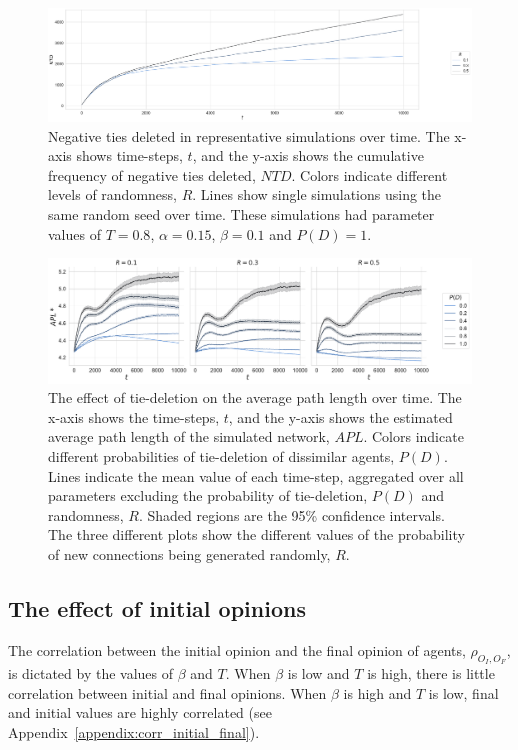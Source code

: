 \documentclass[11pt]{article}
\begin{document}
\begin{figure}[H]
    \centering
    \includegraphics[width=.7\linewidth]{../plots/example/Example_Negative_Ties_Deleted.pdf}
  \caption{Negative ties deleted in representative simulations over time. The x-axis shows time-steps, $t$, and the y-axis shows the cumulative frequency of negative ties deleted, $NTD$. Colors indicate different levels of randomness, $R$. Lines show single simulations using the same random seed over time. These simulations had parameter values of $T = 0.8$, $\alpha = 0.15$, $\beta = 0.1$ and $P(D)=1$.}
  \label{appendix:example_ntd}
\end{figure}

\begin{figure}[H]
    \centering
    \includegraphics[width=.98\linewidth]{../plots/overall/Average_Path_Length_Ties_Deleted.pdf}
  \caption{The effect of tie-deletion on the average path length over time. The x-axis shows the time-steps, $t$, and the y-axis shows the estimated average path length of the simulated network, $APL$. Colors indicate different probabilities of tie-deletion of dissimilar agents, $P(D)$. Lines indicate the mean value of each time-step, aggregated over all parameters excluding the probability of tie-deletion, $P(D)$ and randomness, $R$. Shaded regions are the 95\% confidence intervals. The three different plots show the different values of the probability of new connections being generated randomly, $R$. }
  \label{appendix:apl}
\end{figure}

\subsection{The effect of initial opinions}
The correlation between the initial opinion and the final opinion of agents, $\rho_{O_I, O_F}$, is dictated by the values of $\beta$ and $T$. When $\beta$ is low and $T$ is high, there is little correlation between initial and final opinions. When $\beta$ is high and $T$ is low, final and initial values are highly correlated (see Appendix~\ref{appendix:corr_initial_final}).
\end{document}
